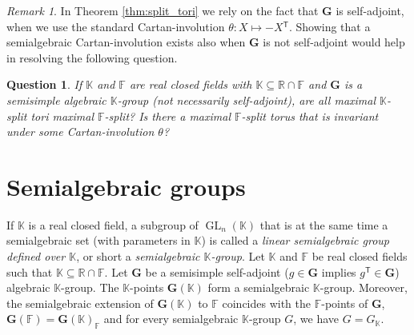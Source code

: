 \documentclass[12pt]{amsart}
\newcommand{\F}{\mathbb{F} }
\newcommand{\R}{\mathbb{R} }
\newcommand{\K}{\mathbb{K}}
\newcommand{\bG}{\mathbf{G}}
\newcommand{\tran}{{^{\mathsf{T}}\!}}
\numberwithin{equation}{section}
\newtheorem{question}[theorem]{Question}
\theoremstyle{remark} %
\newtheorem{remark}{Remark}[section]
\begin{document}
\begin{remark}\label{rem:self-adjoint}
	In Theorem \ref{thm:split_tori} we rely on the fact that $\bG$ is self-adjoint, when we use the standard Cartan-involution $\theta \colon X \mapsto -X\tran$. Showing that a semialgebraic Cartan-involution exists also when $\bG$ is not self-adjoint would help in resolving the following question. 
\end{remark}

\begin{question}
	If $\K$ and $\F$ are real closed fields with $\K \subseteq \R \cap \F$ and $\bG$ is a semisimple algebraic $\K$-group (not necessarily self-adjoint), are all maximal $\K$-split tori maximal $\F$-split? Is there a maximal $\F$-split torus that is invariant under some Cartan-involution $\theta$? 
\end{question}

 

\section{Semialgebraic groups}\label{sec:decompositions}


If $\K$ is a real closed field, a subgroup of $\operatorname{GL}_n(\K)$ that is at the same time a semialgebraic set (with parameters in $\K$) is called a \emph{linear semialgebraic group defined over $\K$}, or short a \emph{semialgebraic $\K$-group}.
Let $\K$ and $\F$ be real closed fields such that $\K \subseteq \R \cap \F$. Let $\bG$ be a semisimple self-adjoint ($g\in \bG$ implies $g\tran \in \bG$) algebraic $\K$-group. 
The $\K$-points $\bG(\K)$ form a semialgebraic $\K$-group. Moreover, the semialgebraic extension of $\bG(\K)$ to $\F$ coincides with the $\F$-points of $\bG$, $\bG(\F) = \bG(\K)_\F$ and for every semialgebraic $\K$-group $G$, we have $G = G_\K$.
\end{document}
